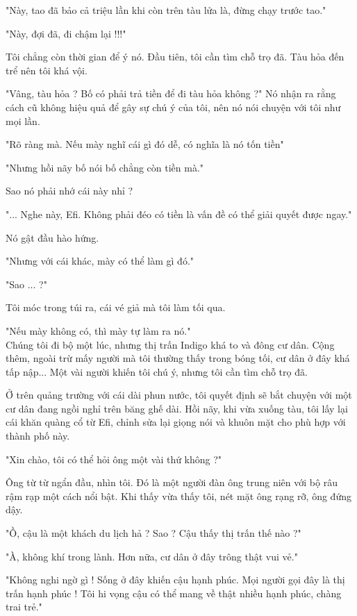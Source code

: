 "Này, tao đã bảo cả triệu lần khi còn trên tàu lửa là, đừng chạy trước tao."

"Này, đợi đã, đi chậm lại !!!"

Tôi chẳng còn thời gian để ý nó. Đầu tiên, tôi cần tìm chỗ trọ đã. Tàu hỏa đến trể nên tôi khá vội.

"Vâng, tàu hỏa  ? Bố có phải trả tiền để đi tàu hỏa không ?" Nó nhận ra rằng cách cũ không hiệu quả để gây sự chú ý của tôi, nên nó nói chuyện với tôi như mọi lần.

"Rõ ràng mà. Nếu mày nghĩ cái gì đó dễ, có nghĩa là nó tốn tiền"

"Nhưng hồi nãy bố nói bố chẳng còn tiền mà."

Sao nó phải nhớ cái này nhỉ ?

"... Nghe này, Efi. Không phải đéo có tiền là vấn đề có thể giải quyết được ngay."

Nó gật đầu hào hứng.

"Nhưng với cái khác, mày có thể làm gì đó."

"Sao ... ?"

Tôi móc trong túi ra, cái vé giả mà tôi làm tối qua.

"Nếu mày không có, thì mày tự làm ra nó."\\

Chúng tôi đi bộ một lúc, nhưng thị trấn Indigo khá to và đông cư dân. Cộng thêm, ngoài trừ mấy người mà tôi thường thấy trong bóng tối, cư dân ở đây khá tấp nập... Một vài người khiến tôi chú ý, nhưng tôi cần tìm chỗ trọ đã.

Ở trên quảng trường với cái dài phun nước, tôi quyết định sẽ bắt chuyện với một cư dân đang ngồi nghỉ trên băng ghế dài. Hồi nãy, khi vừa xuống tàu, tôi lấy lại cái khăn quàng cổ từ Efi, chỉnh sửa lại giọng nói và khuôn mặt cho phù hợp với thành phố này. 

"Xin chào, tôi có thể hỏi ông một vài thứ không ?"

Ông từ từ ngẩn đầu, nhìn tôi. Đó là một người đàn ông trung niên với bộ râu rậm rạp một cách nổi bật. Khi thấy vừa thấy tôi, nét mặt ông rạng rỡ, ông đứng dậy.

"Ồ, cậu là một khách du lịch hả ? Sao ? Cậu thấy thị trấn thế nào ?"

"À, không khí trong lành. Hơn nữa, cư dân ở đây trông thật vui vẻ."
   
"Không nghi ngờ gì ! Sống ở đây khiến cậu hạnh phúc. Mọi người gọi đây là thị trấn hạnh phúc ! Tôi hi vọng cậu có thể mang về thật nhiều hạnh phúc, chàng trai trẻ."

